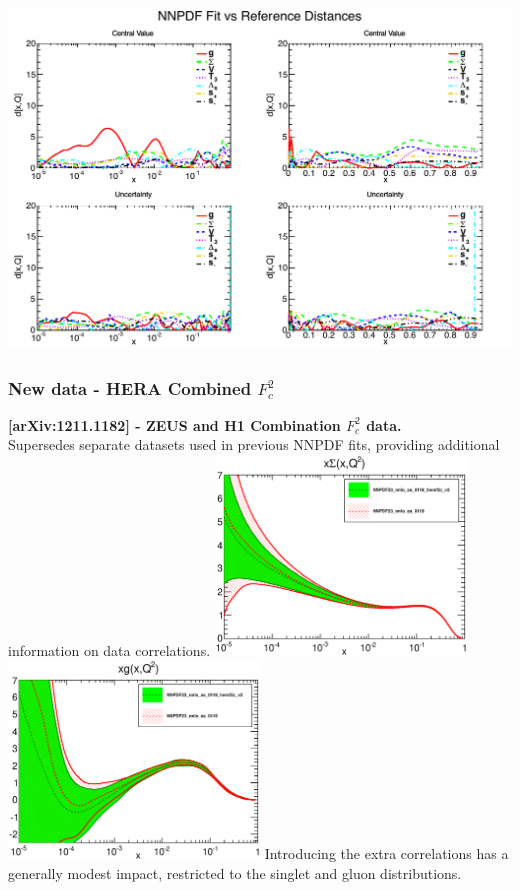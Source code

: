 \documentclass[10pt]{beamer}
\begin{document}
\begin{frame}
     \includegraphics[width=1.0\textwidth]{HERA-II_distancesv2.pdf}

\end{frame}


\begin{frame}
\frametitle{New data - HERA Combined $F^2_c$}
\textbf{[arXiv:1211.1182] - ZEUS and H1 Combination $F^2_c$ data.}\\ \vskip5pt
Supersedes separate datasets used in previous NNPDF fits, providing additional information on data correlations.
\vskip10pt
    \includegraphics[width=0.5\textwidth]{pdf_xSigma_log_f2c.eps}
        \includegraphics[width=0.5\textwidth]{pdf_xg_log_f2c.eps}
        \vskip10pt
Introducing the extra correlations has a generally modest impact, restricted to the singlet and gluon distributions.
\end{frame}
\end{document}
